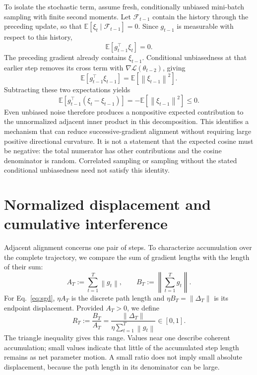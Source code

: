 \documentclass[11pt]{article}
\newcommand{\norm}[1]{\left\lVert#1\right\rVert}
\newcommand{\E}{\mathbb{E}}
\newcommand{\Loss}{\mathcal{L}}
\begin{document}
To isolate the stochastic term, assume fresh, conditionally unbiased mini-batch
sampling with finite second moments. Let $\mathcal F_{t-1}$ contain the history
through the preceding update, so that
$\E[\xi_t\mid\mathcal F_{t-1}]=0$. Since $g_{t-1}$ is measurable with respect
to this history,
\begin{equation}
  \E[g_{t-1}^\top\xi_t]=0.
  \label{eq:fresh-noise}
\end{equation}
The preceding gradient already contains $\xi_{t-1}$. Conditional unbiasedness
at that earlier step removes its cross term with
$\nabla\Loss(\theta_{t-2})$, giving
\begin{equation}
  \E[g_{t-1}^\top\xi_{t-1}]=\E[\norm{\xi_{t-1}}^2].
\end{equation}
Subtracting these two expectations yields
\begin{equation}
  \boxed{\E[g_{t-1}^\top(\xi_t-\xi_{t-1})]
              =-\E[\norm{\xi_{t-1}}^2]\leq0.}
  \label{eq:noise-expectation}
\end{equation}
Even unbiased noise therefore produces a nonpositive expected contribution to
the unnormalized adjacent inner product in this decomposition. This identifies
a mechanism that can reduce successive-gradient alignment without requiring
large positive directional curvature. It is not a statement that the expected
cosine must be negative: the total numerator has other contributions and the
cosine denominator is random. Correlated sampling or sampling without the stated
conditional unbiasedness need not satisfy this identity.

\section{Normalized displacement and cumulative interference}

Adjacent alignment concerns one pair of steps. To characterize accumulation
over the complete trajectory, we compare the sum of gradient lengths with the
length of their sum:
\begin{equation}
  A_T:=\sum_{t=1}^T\norm{g_t},
  \qquad B_T:=\norm{\sum_{t=1}^T g_t}.
  \label{eq:ab}
\end{equation}
For Eq.~\eqref{eq:sgd}, $\eta A_T$ is the discrete path length and
$\eta B_T=\norm{\Delta_T}$ is its endpoint displacement. Provided $A_T>0$,
we define
\begin{equation}
  \boxed{R_T:=\frac{B_T}{A_T}
       =\frac{\norm{\Delta_T}}{\eta\sum_{t=1}^T\norm{g_t}}\in[0,1].}
  \label{eq:normalized-displacement}
\end{equation}
The triangle inequality gives this range. Values near one describe coherent
accumulation; small values indicate that little of the accumulated step length
remains as net parameter motion. A small ratio does not imply small absolute
displacement, because the path length in its denominator can be large.
\end{document}
